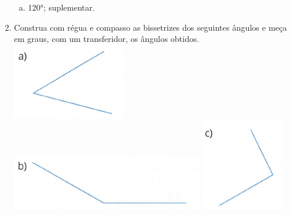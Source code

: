 \documentclass[a4paper,14pt]{article}
\begin{document}
\begin{multicols}{2}
\begin{enumerate}
\begin{enumerate}[a)]
					\item 120°; suplementar. \newpage
				\end{enumerate}
			\item Construa com régua e compasso as bissetrizes dos seguintes ângulos e meça em graus, com um transferidor, os ângulos obtidos. \\
			\includegraphics[width=1\linewidth]{6FMA87_imagens/imagem9}
			\includegraphics[width=1\linewidth]{6FMA87_imagens/imagem10}
			\includegraphics[width=1\linewidth]{6FMA87_imagens/imagem11}

\end{enumerate}
\end{multicols}
\end{document}
